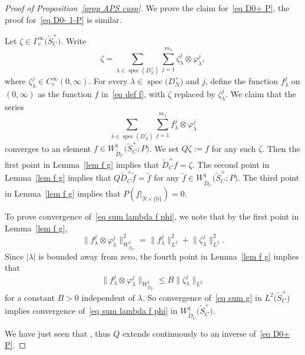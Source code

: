 \documentclass[pdftex]{sigma}%
\numberwithin{equation}{section}
\DeclareMathOperator{\spec}{spec}
\begin{document}
\begin{proof}[Proof of Proposition~\ref{prop APS cusp}]
We prove the claim for~\eqref{eq D0+ P}, the proof for~\eqref{eq D0- 1-P} is similar.

Let $\zeta \in \Gamma^{\infty}_c\big(\widetilde{S}_C^+\big)$. Write
\begin{equation} \label{eq sum g}
\zeta = \sum_{\lambda \in \spec(D_N^+)} \sum_{j=1}^{m_{\lambda}} \zeta_{\lambda}^j \otimes \varphi_{\lambda}^j,
\end{equation}
where $\zeta_{\lambda}^j \in C^{\infty}_c(0,\infty)$. For every $\lambda \in \spec\big(D_N^+\big)$ and $j$, define the function $f_{\lambda}^j$ on $(0,\infty)$ as the function $f$ in~\eqref{eq def f}, with $\zeta$ replaced by $\zeta_{\lambda}^j$. We claim that the series
\begin{equation} \label{eq sum lambda f phi}
 \sum_{\lambda \in \spec(D_N^+)} \sum_{j=1}^{m_{\lambda}} f_{\lambda}^j \otimes \varphi_{\lambda}^j
\end{equation}
converges to an element $f \in W^1_{\widetilde{D}_C}\big(\widetilde{S}_C^+; P\big)$. We set $Q\zeta := f$ for any such $\zeta$.
Then the first point in Lemma~\ref{lem f g} implies that $\widetilde{D}_C^+ f = \zeta$. The second point in Lemma~\ref{lem f g} implies that $Q\widetilde{D}_C^+ \tilde f = \tilde f$ for any $\tilde f \in W^1_{\widetilde{D}_C}\big(\widetilde{S}_C^+; P\big)$.
The third point in Lemma~\ref{lem f g} implies that $P(f|_{N \times \{0\}}) = 0$.

To prove convergence of~\eqref{eq sum lambda f phi}, we note that by the first point in Lemma~\ref{lem f g},
\[
\big\| f_{\lambda}^j \otimes \varphi_{\lambda}^j\big\|_{W^1_{\widetilde{D}_C}}^2 = \big\|f_{\lambda}^j\big\|_{L^2}^2+\big\|\zeta_{\lambda}^j\big\|_{L^2}^2.
\]
Since $|\lambda|$ is bounded away from zero, the fourth point in Lemma~\ref{lem f g} implies that
\begin{equation} \label{eq est flam glam}
\big\| f_{\lambda}^j \otimes \varphi_{\lambda}^j\big\|_{W^1_{\widetilde{D}_C}} \leq B \big\|\zeta_{\lambda}^j\big\|_{L^2}
\end{equation}
for a constant $B>0$ independent of $\lambda$. So convergence of~\eqref{eq sum g} in $L^2\big(\widetilde{S}_C^+\big)$ implies convergence of~\eqref{eq sum lambda f phi} in $W^1_{\widetilde{D}_C}\big(\widetilde{S}_C^+\big)$.

We have just seen that , thus
 $Q$ extends continuously to an inverse of~\eqref{eq D0+ P}.
\end{proof}
\end{document}
